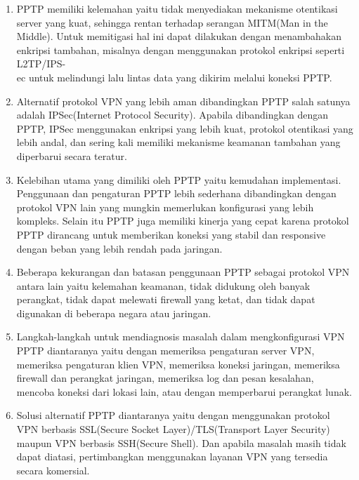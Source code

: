 \begin{enumerate}
    \item PPTP memiliki kelemahan yaitu tidak menyediakan mekanisme otentikasi server yang kuat, sehingga rentan terhadap serangan MITM(Man in the Middle). Untuk memitigasi hal ini dapat dilakukan dengan menambahakan enkripsi tambahan, misalnya dengan menggunakan protokol enkripsi seperti L2TP/IPS-\\ec untuk melindungi lalu lintas data yang dikirim melalui koneksi PPTP.

    \item Alternatif protokol VPN yang lebih aman dibandingkan PPTP salah satunya adalah IPSec(Internet Protocol Security). Apabila dibandingkan dengan PPTP, IPSec menggunakan enkripsi yang lebih kuat, protokol otentikasi yang lebih andal, dan sering kali memiliki mekanisme keamanan tambahan yang diperbarui secara teratur.
    
    \item Kelebihan utama yang dimiliki oleh PPTP yaitu kemudahan implementasi. Penggunaan dan pengaturan PPTP lebih sederhana dibandingkan dengan protokol VPN lain yang mungkin memerlukan konfigurasi yang lebih kompleks. Selain itu PPTP juga memiliki kinerja yang cepat karena protokol PPTP dirancang untuk memberikan koneksi yang stabil dan responsive dengan beban yang lebih rendah pada jaringan.
    
    \item Beberapa kekurangan dan batasan penggunaan PPTP sebagai protokol VPN antara lain yaitu kelemahan keamanan, tidak didukung oleh banyak perangkat, tidak dapat melewati firewall yang ketat, dan tidak dapat digunakan di beberapa negara atau jaringan.
    
    \item Langkah-langkah untuk mendiagnosis masalah dalam mengkonfigurasi VPN PPTP diantaranya yaitu dengan memeriksa pengaturan server VPN, memeriksa pengaturan klien VPN, memeriksa koneksi jaringan, memeriksa firewall dan perangkat jaringan, memeriksa log dan pesan kesalahan, mencoba koneksi dari lokasi lain, atau dengan memperbarui perangkat lunak.
    
    \item Solusi alternatif PPTP diantaranya yaitu dengan menggunakan protokol VPN berbasis SSL(Secure Socket Layer)/TLS(Transport Layer Security) maupun VPN berbasis SSH(Secure Shell). Dan apabila masalah masih tidak dapat diatasi, pertimbangkan menggunakan layanan VPN yang tersedia secara komersial.
    
\end{enumerate}